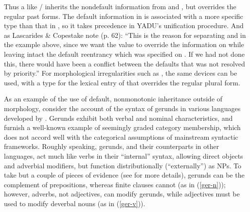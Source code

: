 \documentclass[output=paper
 	        ,biblatex
                ,babelshorthands
                ,newtxmath
                ,draftmode
                ,colorlinks, citecolor=brown
]{langscibook}
\begin{document}
Thus a  like / inherits the nondefault information from  and , but overrides the regular past forms.
The default information in  is associated with a more specific type than that in , so it takes precedence in YADU's unification procedure.
And as Lascarides \& Copestake note (p. 62): ``This is the reason for separating  and  in the example above, since we want the  value to override the  information on  while leaving intact the default reentrancy which was specified on .  If we had not done this, there would have been a conflict between the defaults that was not resolved by priority.'' For morphological irregularities such as , the same devices can be used, with a type for the lexical entry of  that overrides the regular plural form.

As an example of the use of default, nonmonotonic inheritance outside of morphology, consider the account of the syntax of gerunds in various languages developed by \citet{Malouf2000a}. 
Gerunds exhibit both verbal and nominal characteristics, and furnish a well-known example of seemingly graded category membership, which does not accord well with the categorical assumptions of mainstream syntactic frameworks.
Roughly speaking,  gerunds, and their counterparts in other languages, act much like verbs in their ``internal'' syntax, allowing direct objects and adverbial modifiers, but function distributionally (``externally'') as NPs.
To take but a couple of pieces of evidence (see \citealt[27--33]{Malouf2000a} for more details), 
gerunds can be the complement of prepositions, whereas finite clauses cannot (as in (\ref{ger-n})); however, adverbs, not adjectives, can modify gerunds, while adjectives must be used to modify deverbal nouns (as in (\ref{ger-v})).


\eal
\label{ger-n}
\zl
\eal
\label{ger-v}
\zl
\end{document}
